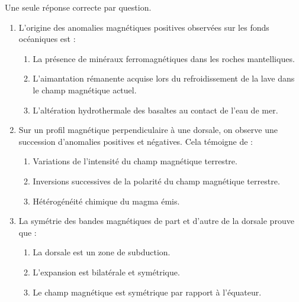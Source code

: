\documentclass[11pt]{article}
\begin{document}
\begin{exercice}
Une seule réponse correcte par question.
\begin{enumerate}
    \item L'origine des anomalies magnétiques positives observées sur les fonds océaniques est :
    \begin{enumerate}
        \item La présence de minéraux ferromagnétiques dans les roches mantelliques.
        \item L'aimantation rémanente acquise lors du refroidissement de la lave dans le champ magnétique actuel.
        \item L'altération hydrothermale des basaltes au contact de l'eau de mer.
    \end{enumerate}
    \item Sur un profil magnétique perpendiculaire à une dorsale, on observe une succession d'anomalies positives et négatives. Cela témoigne de :
    \begin{enumerate}
        \item Variations de l'intensité du champ magnétique terrestre.
        \item Inversions successives de la polarité du champ magnétique terrestre.
        \item Hétérogénéité chimique du magma émis.
    \end{enumerate}
    \item La symétrie des bandes magnétiques de part et d'autre de la dorsale prouve que :
    \begin{enumerate}
        \item La dorsale est un zone de subduction.
        \item L'expansion est bilatérale et symétrique.
        \item Le champ magnétique est symétrique par rapport à l'équateur.
    \end{enumerate}
\end{enumerate}
\end{exercice}
\end{document}
